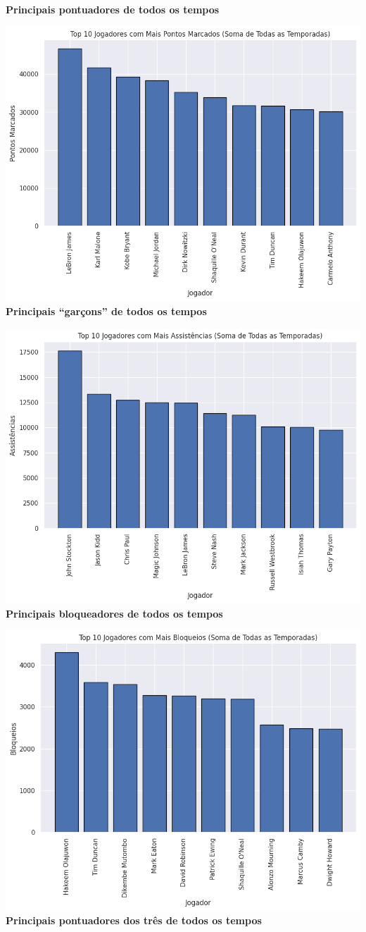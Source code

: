 \documentclass[
]{book}
\begin{document}
\textbf{Principais pontuadores de todos os tempos}

\includegraphics{imagens/16.png} \textbf{Principais ``garçons'' de todos os tempos}

\includegraphics{imagens/17.png} \textbf{Principais bloqueadores de todos os tempos}

\includegraphics{imagens/18.png} \textbf{Principais pontuadores dos três de todos os tempos}
\end{document}
